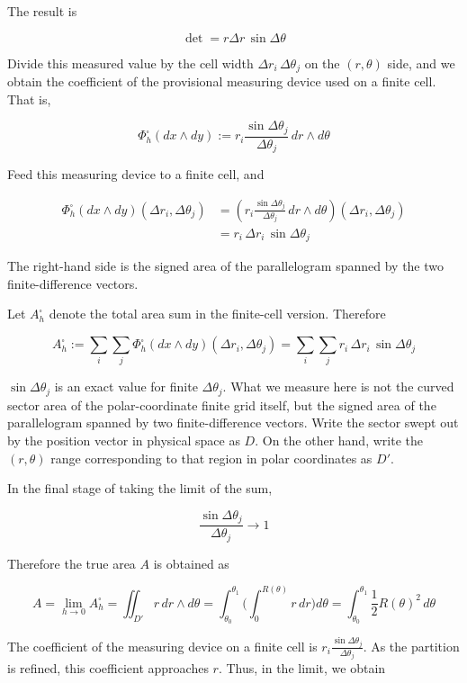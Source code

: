 \documentclass[a4paper,12pt,openany]{book}
\begin{document}
The result is

\[\det = r\Delta r\,\sin\Delta\theta\]

Divide this measured value by the cell width
\(\Delta r_i\,\Delta\theta_j\) on the \((r,\theta)\) side, and we obtain
the coefficient of the provisional measuring device used on a finite
cell. That is,

\[
\Phi_h^\square(dx\wedge dy)
:=
r_i\frac{\sin\Delta\theta_j}{\Delta\theta_j}\,dr\wedge d\theta
\]

Feed this measuring device to a finite cell, and

\[
\begin{aligned}
\Phi_h^\square(dx\wedge dy)(\Delta r_i,\Delta\theta_j)
&=
\left(
r_i\frac{\sin\Delta\theta_j}{\Delta\theta_j}\,dr\wedge d\theta
\right)(\Delta r_i,\Delta\theta_j) \\
&=
r_i\,\Delta r_i\,\sin\Delta\theta_j
\end{aligned}
\]

The right-hand side is the signed area of the parallelogram spanned by
the two finite-difference vectors.

Let \(A_h^\square\) denote the total area sum in the finite-cell
version. Therefore

\[
A_h^\square
:=
\sum_i\sum_j
\Phi_h^\square(dx\wedge dy)(\Delta r_i,\Delta\theta_j)
=
\sum_i\sum_j r_i\,\Delta r_i\,\sin\Delta\theta_j
\]

\(\sin\Delta\theta_j\) is an exact value for finite \(\Delta\theta_j\).
What we measure here is not the curved sector area of the
polar-coordinate finite grid itself, but the signed area of the
parallelogram spanned by two finite-difference vectors. Write the sector
swept out by the position vector in physical space as \(D\). On the
other hand, write the \((r,\theta)\) range corresponding to that region
in polar coordinates as \(D'\).

In the final stage of taking the limit of the sum,

\[
\frac{\sin\Delta\theta_j}{\Delta\theta_j}\to 1
\]

Therefore the true area \(A\) is obtained as

\[
A
=
\lim_{h\to0} A_h^\square
=
\iint_{D'} r\,dr\wedge d\theta
=
\int_{\theta_0}^{\theta_1}
\biggl(
  \int_0^{R(\theta)} r\,dr
\biggr)
d\theta
=
\int_{\theta_0}^{\theta_1}
\frac{1}{2}R(\theta)^2\,d\theta
\]

The coefficient of the measuring device on a finite cell is
\(r_i\frac{\sin\Delta\theta_j}{\Delta\theta_j}\). As the partition is
refined, this coefficient approaches \(r\). Thus, in the limit, we
obtain
\end{document}
